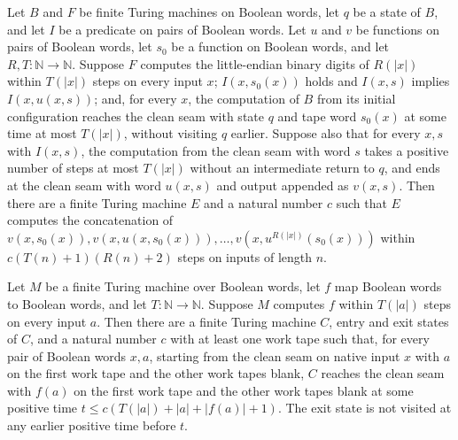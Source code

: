 \begin{theorem}
\label{Turing.FinTM.exists_emitLoopTM}
\leanok
{}
Let $B$ and $F$ be finite Turing machines on Boolean words, let $q$ be a state of $B$,
and let $I$ be a predicate on pairs of Boolean words. Let $u$ and $v$ be functions on
pairs of Boolean words, let $s_0$ be a function on Boolean words, and let $R,T :
\mathbb{N} \to \mathbb{N}$. Suppose $F$ computes the little-endian binary digits of
$R(|x|)$ within $T(|x|)$ steps on every input $x$; $I(x,s_0(x))$ holds and $I(x,s)$
implies $I(x,u(x,s))$; and, for every $x$, the computation of $B$ from its initial
configuration reaches the clean seam with state $q$ and tape word $s_0(x)$ at some time
at most $T(|x|)$, without visiting $q$ earlier. Suppose also that for every $x,s$ with
$I(x,s)$, the computation from the clean seam with word $s$ takes a positive number of
steps at most $T(|x|)$ without an intermediate return to $q$, and ends at the clean seam
with word $u(x,s)$ and output appended as $v(x,s)$. Then there are a finite Turing
machine $E$ and a natural number $c$ such that $E$ computes the concatenation of
$v(x,s_0(x)),v(x,u(x,s_0(x))),\ldots,v(x,u^ {R(|x|)}(s_0(x)))$ within
$c(T(n)+1)(R(n)+2)$ steps on inputs of length $n$.
\end{theorem}

\begin{theorem}
\label{Turing.FinTM.exists_installCallTM}
\leanok
{}
Let $M$ be a finite Turing machine over Boolean words, let $f$ map Boolean words to
Boolean words, and let $T : \mathbb{N} \to \mathbb{N}$. Suppose $M$ computes $f$
within $T(|a|)$ steps on every input $a$. Then there are a finite Turing machine $C$,
entry and exit states of $C$, and a natural number $c$ with at least one work tape such
that, for every pair of Boolean words $x,a$, starting from the clean seam on native
input $x$ with $a$ on the first work tape and the other work tapes blank, $C$ reaches
the clean seam with $f(a)$ on the first work tape and the other work tapes blank at some
positive time $t\le c(T(|a|)+|a|+|f(a)|+1)$. The exit state is not visited at any
earlier positive time before $t$.
\end{theorem}

